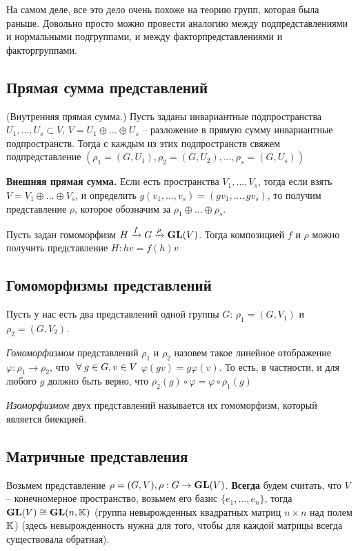 \begin{comm}
	На самом деле, все это дело очень похоже на теорию групп, которая была раньше. Довольно просто можно провести аналогию между подпредставлениями и нормальными подгруппами, и между факторпредставлениями и факторгруппами.
\end{comm}

\subsection{Прямая сумма представлений}

\begin{df} (Внутренняя прямая сумма.)
	Пусть заданы инвариантные подпространства $U_1, \ldots, U_s \subset V$, $V = U_1 \oplus \ldots \oplus U_s$ -- разложение в прямую сумму инвариантные подпространств. Тогда с каждым из этих подпространств свяжем подпредставление $(\rho_1 = (G, U_1), \rho_2 = (G, U_2), \ldots , \rho_s = (G, U_s))$ 
\end{df}

{\bf Внешняя прямая сумма.} Если есть пространства $V_1, \ldots, V_s$, тогда если взять $V = V_1 \oplus \ldots \oplus V_s$, и определить $g(v_1, \ldots, v_s) = (gv_1, \ldots, gv_s)$, то получим представление $\rho$, которое обозначим за $\rho_1 \oplus \ldots \oplus \rho_s$.

Пусть задан гомоморфизм $H \xrightarrow{f} G \xrightarrow{\rho} \mathbf{GL}(V)$. Тогда композицией $f$ и $\rho$ можно получить представление $H: hv = f(h)v$


\subsection{Гомоморфизмы представлений}

Пусть у нас есть два представлений одной группы $G$: $\rho_1 = (G, V_1)$ и $\rho_2 = (G, V_2)$. 
\begin{df}
	{\it Гомоморфизмом} представлений $\rho_1$ и $\rho_2$ назовем такое линейное отображение $\varphi: \rho_1 \rightarrow \rho_2$, что $~\forall\; g \in G, v \in V$ $\varphi(gv) = g\varphi(v)$. То есть, в частности, и для любого $g$ должно быть верно, что $\rho_2(g) \circ \varphi = \varphi \circ \rho_1(g)$
\end{df}


\begin{df}
	{\it Изоморфизмом} двух представлений называется их гомоморфизм, который является биекцией.
\end{df}

\subsection{Матричные представления}
Возьмем представление $\rho = (G, V), \rho: G \rightarrow \mathbf{GL}(V)$. {\bf Всегда} будем считать, что $V$ -- конечномерное пространство, возьмем его базис $\lbrace e_1, \ldots , e_n \rbrace$, тогда $\mathbf{GL}(V) \cong \mathbf{GL}(n, \mathbb{K})$ (группа невырожденных квадратных матриц $n \times n$ над полем $\mathbb{K}$) (здесь невырожденность нужна для того, чтобы для каждой матрицы всегда существовала обратная).

